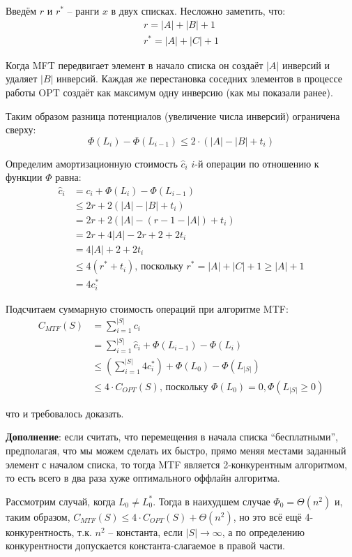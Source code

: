 \documentclass[a4paper,11pt]{article}
\begin{document}
Введём $r$ и $r^*$ -- ранги $x$ в двух списках. Несложно заметить, что:
\begin{gather*}
  r = |A| + |B| + 1 \\
  r^* = |A| + |C| + 1
\end{gather*}

Когда MFT передвигает элемент в начало списка он создаёт $|A|$ инверсий и
удаляет $|B|$ инверсий. Каждая же перестановка соседних элементов в процессе
работы OPT создаёт как максимум одну инверсию (как мы показали ранее).

Таким образом разница потенциалов (увеличение числа инверсий) ограничена сверху:
$$
\Phi(L_i) - \Phi(L_{i-1}) \leqslant 2 \cdot (|A| - |B| + t_i)
$$


Определим амортизационную стоимость $\hat{c}_i$ $i$-й операции по отношению к
функции $\Phi$ равна:
\begin{align*}
\hat{c}_i &= c_i + \Phi(L_i) - \Phi(L_{i-1})  \\
  &\leqslant 2r + 2(|A| - |B| + t_i) \\
  &= 2r + 2(|A| - (r - 1 - |A|) + t_i) \\
  &= 2r + 4|A| - 2r + 2 + 2t_i \\
  &= 4|A| + 2 + 2t_i \\
  &\leqslant 4(r^* + t_i) \text{, поскольку } r^* = |A| + |C| + 1 \geqslant |A| +
  1 \\
  &= 4c_i^*
\end{align*}

Подсчитаем суммарную стоимость операций при алгоритме MTF:
\begin{align*}
  C_{MTF}(S) &= \sum_{i=1}^{|S|} c_i \\
  &= \sum_{i=1}^{|S|} \hat{c}_i + \Phi(L_{i-1}) - \Phi(L_i) \\
  &\leqslant (\sum_{i=1}^{|S|} 4c_i^*) + \Phi(L_0) - \Phi(L_{|S|}) \\
  &\leqslant 4 \cdot C_{OPT}(S) \text{, поскольку } \Phi(L_0) = 0, \Phi(L_{|S|}
  \geqslant 0)
\end{align*}

что и требовалось доказать.

\textbf{Дополнение}: если считать, что перемещения в начала списка  ``бесплатными'', предполагая,
что мы можем сделать их быстро, прямо меняя местами заданный элемент с началом
списка, то тогда MTF является 2-конкурентным алгоритмом, то есть всего в два
раза хуже оптимального оффлайн алгоритма.

Рассмотрим случай, когда $L_0 \neq L_0^*$. Тогда в наихудшем случае $\Phi_0 =
\Theta(n^2)$ и, таким образом, $C_{MTF}(S) \leqslant 4\cdot C_{OPT}(S) +
\Theta(n^2)$, но это всё ещё 4-конкурентность, т.к. $n^2$ -- константа, если
$|S| \rightarrow \infty$, а по определению конкурентности допускается
константа-слагаемое в правой части.
\end{document}
